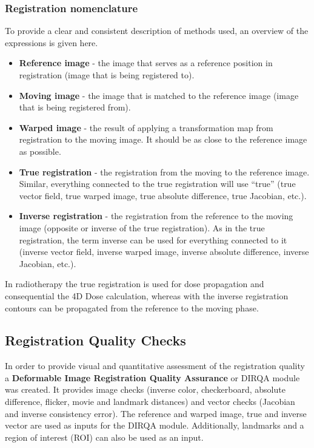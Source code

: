 \subsubsection{Registration nomenclature}

To provide a clear and consistent description of methods used, an overview of the expressions is given here.

\begin{itemize}
 \item \textbf{Reference image} - the image that serves as a reference position in registration (image that is being registered to).
 \item \textbf{Moving image} - the image that is matched to the reference image (image that is being registered from).
 \item \textbf{Warped image} - the result of applying a transformation map from registration to the moving image. It should be as close to the reference image as possible.
 \item \textbf{True registration} - the registration from the moving to the reference image. Similar, everything connected to the true registration will use ``true'' (true vector field, true warped image, true absolute difference, true Jacobian, etc.).
 \item \textbf{Inverse registration} - the registration from the reference to the moving image (opposite or inverse of the true registration). As in the true registration, the term inverse can be used for everything connected to it (inverse vector field, inverse warped image, inverse absolute difference, inverse Jacobian, etc.).
\end{itemize}

In radiotherapy the true registration is used for dose propagation and consequential the 4D Dose calculation, whereas with the inverse registration contours can be propagated from the reference to the moving phase.


\subsection{Registration Quality Checks}
\label{DIRQA}

In order to provide visual and quantitative assessment of the registration quality a \textbf{Deformable Image Registration Quality Assurance} or DIRQA module was created. 
It provides image checks (inverse color, checkerboard, absolute difference, flicker, movie and landmark distances) 
and vector checks (Jacobian and inverse consistency error). 
The reference and warped image, true and inverse vector are used as inputs for the DIRQA module. 
Additionally, landmarks and a region of interest (ROI) can also be used as an input.

